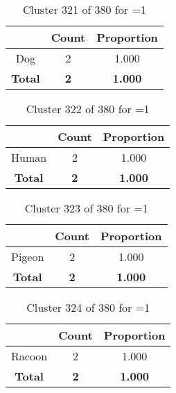 \begin{table}[ht!]
\centering
\begin{tabular}{|c|c|c|}
\hline
\bf \Spec{} &\bf Count &\bf Proportion\\ \hline \hline
Dog & 2 & 1.000\\ \hline
\hline
\bf Total & \bf 2 & \bf 1.000\\ \hline
\end{tabular}
\label{tab:cluster:321:1}
\caption{Cluster 321 of 380 for \minneigh{}=1}
\end{table}

\begin{table}[ht!]
\centering
\begin{tabular}{|c|c|c|}
\hline
\bf \Spec{} &\bf Count &\bf Proportion\\ \hline \hline
Human & 2 & 1.000\\ \hline
\hline
\bf Total & \bf 2 & \bf 1.000\\ \hline
\end{tabular}
\label{tab:cluster:322:1}
\caption{Cluster 322 of 380 for \minneigh{}=1}
\end{table}

\begin{table}[ht!]
\centering
\begin{tabular}{|c|c|c|}
\hline
\bf \Spec{} &\bf Count &\bf Proportion\\ \hline \hline
Pigeon & 2 & 1.000\\ \hline
\hline
\bf Total & \bf 2 & \bf 1.000\\ \hline
\end{tabular}
\label{tab:cluster:323:1}
\caption{Cluster 323 of 380 for \minneigh{}=1}
\end{table}

\begin{table}[ht!]
\centering
\begin{tabular}{|c|c|c|}
\hline
\bf \Spec{} &\bf Count &\bf Proportion\\ \hline \hline
Racoon & 2 & 1.000\\ \hline
\hline
\bf Total & \bf 2 & \bf 1.000\\ \hline
\end{tabular}
\label{tab:cluster:324:1}
\caption{Cluster 324 of 380 for \minneigh{}=1}
\end{table}

